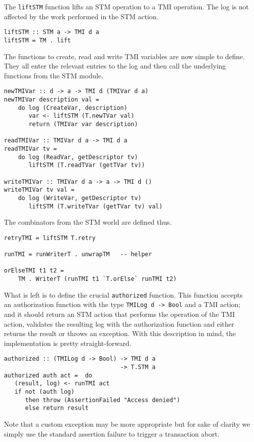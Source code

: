 The \lstinline+liftSTM+ function lifts an STM operation to a TMI operation. The log
is not affected by the work performed in the STM action.
\begin{lstlisting}[style=small]
liftSTM :: STM a -> TMI d a
liftSTM = TM . lift
\end{lstlisting}

The functions to create, read and write TMI variables are now simple to define. They
all enter the relevant entries to the log and then call the underlying functions
from the STM module.
\begin{lstlisting}[style=small]
newTMIVar :: d -> a -> TMI d (TMIVar d a)
newTMIVar description val =
    do log (CreateVar, description)
       var <- liftSTM (T.newTVar val)
       return (TMIVar var description)

readTMIVar :: TMIVar d a -> TMI d a
readTMIVar tv = 
    do log (ReadVar, getDescriptor tv)
       liftSTM (T.readTVar (getTVar tv))

writeTMIVar :: TMIVar d a -> a -> TMI d ()
writeTMIVar tv val = 
    do log (WriteVar, getDescriptor tv)
       liftSTM (T.writeTVar (getTVar tv) val)
\end{lstlisting}

The combinators from the STM world are defined thus.
\begin{lstlisting}[style=small]
retryTMI = liftSTM T.retry

runTMI = runWriterT . unwrapTM   -- helper

orElseTMI t1 t2 = 
    TM . WriterT (runTMI t1 `T.orElse` runTMI t2)
\end{lstlisting}

What is left is to define the crucial \lstinline+authorized+ function. This function
accepts an authorization function with the type \lstinline+TMILog d -> Bool+
and a TMI action; and it should return an STM action that performs the operation
of the TMI action, validates the resulting log with the authorization function and
either returns the result or throws an exception. With this description in mind,
the implementation is pretty straight-forward.
\begin{lstlisting}[style=small]
authorized :: (TMILog d -> Bool) -> TMI d a 
                                 -> T.STM a
authorized auth act =  do
   (result, log) <- runTMI act
   if not (auth log)
      then throw (AssertionFailed "Access denied")
      else return result
\end{lstlisting}
Note that a custom exception may be more appropriate but for sake of clarity
we simply use the standard assertion failure to trigger a transaction abort.

